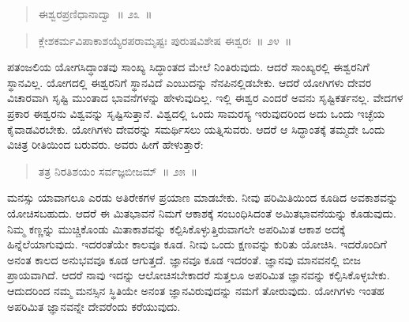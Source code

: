 \begin{verse}
ಈಶ್ವರಪ್ರಣಿಧಾನಾದ್ವಾ~॥ ೨೩~॥
\end{verse}

\vspace{-0.35cm}


\vspace{-0.1cm}

\begin{verse}
ಕ್ಲೇಶಕರ್ಮವಿಪಾಕಾಶಯ್ಯೆರಪರಾಮೃಷ್ಟಃ ಪುರುಷವಿಶೇಷ ಈಶ್ವರಃ~॥ ೨೪~॥
\end{verse}

\vspace{-0.4cm}


\vspace{0.1cm}

ಪತಂಜಲಿಯ ಯೋಗಸಿದ್ಧಾಂತವು ಸಾಂಖ್ಯ ಸಿದ್ಧಾಂತದ ಮೇಲೆ ನಿಂತಿರುವುದು. ಆದರೆ ಸಾಂಖ್ಯರಲ್ಲಿ ಈಶ್ವರನಿಗೆ ಸ್ಥಾನವಿಲ್ಲ. ಯೋಗದಲ್ಲಿ ಈಶ್ವರನಿಗೆ ಸ್ಥಾನವಿದೆ ಎಂಬುದನ್ನು ನೆನಪಿನಲ್ಲಿಡಬೇಕು. ಆದರೆ ಯೋಗಿಗಳು ದೇವರ ವಿಚಾರವಾಗಿ ಸೃಷ್ಟಿ ಮುಂತಾದ ಭಾವನೆ\break ಗಳನ್ನು ಹೇಳುವುದಿಲ್ಲ. ಇಲ್ಲಿ ಈಶ್ವರ ಎಂದರೆ ಅವನು ಸೃಷ್ಟಿಕರ್ತನಲ್ಲ. ವೇದಗಳ ಪ್ರಕಾರ ಈಶ್ವರನು ವಿಶ್ವವನ್ನು ಸೃಷ್ಟಿಸುತ್ತಾನೆ. ವಿಶ್ವದಲ್ಲಿ ಒಂದು ಸಾಮರಸ್ಯ ಇರುವುದರಿಂದ ಅದು ಒಂದು ಇಚ್ಛೆಯ ಕೈವಾಡವಿರಬೇಕು. ಯೋಗಿಗಳು ದೇವರನ್ನು ಸಮರ್ಥಿಸಲು ಯತ್ನಿಸುವರು. ಆದರೆ ಆ ಸಿದ್ಧಾಂತಕ್ಕೆ ತಮ್ಮದೇ ಒಂದು ವಿಚಿತ್ರ ರೀತಿಯಿಂದ ಬರುವರು. ಅವರು ಹೀಗೆ ಹೇಳುತ್ತಾರೆ:

\vspace{-0.25cm}

\begin{verse}
ತತ್ರ ನಿರತಿಶಯಂ ಸರ್ವಜ್ಞಬೀಜಮ್​~॥ ೨೫~॥
\end{verse}

\vspace{-0.4cm}


ಮನಸ್ಸು ಯಾವಾಗಲೂ ಎರಡು ಅತಿರೇಕಗಳ ಪ್ರಯಾಣ ಮಾಡಬೇಕು. ನೀವು ಪರಿಮಿತಿಯಿಂದ ಕೂಡಿದ ಅವಕಾಶವನ್ನು ಯೋಚಿಸಬಹುದು. ಆದರೆ ಈ ಮಿತಭಾವನೆ ನಿಮಗೆ ಆಕಾಶಕ್ಕೆ ಸಂಬಂಧಿಸಿದಂತೆ ಅಮಿತಭಾವನೆಯನ್ನು ಕೊಡುವುದು. ನಿಮ್ಮ ಕಣ್ಣನ್ನು ಮುಚ್ಚಿಕೊಂಡು ಮಿತಾಕಾಶವನ್ನು ಕಲ್ಪಿಸಿಕೊಳ್ಳುತ್ತಿರುವಾಗಲೇ ಅಪರಿಮಿತ ಆಕಾಶ ಅದಕ್ಕೆ ಹಿನ್ನೆಲೆಯಾಗುವುದು. ಇದರಂತೆಯೇ ಕಾಲವೂ ಕೂಡ. ನೀವು ಒಂದು ಕ್ಷಣವನ್ನು ಕುರಿತು ಯೋಚಿಸಿ. ಇದರೊಂದಿಗೆ ಅನಂತ ಕಾಲದ ಅನುಭವವೂ ಕೂಡ ಆಗುತ್ತದೆ. ಜ್ಞಾನವೂ ಕೂಡ ಇದರಂತೆ. ಜ್ಞಾನವು ಮಾನವನಲ್ಲಿ ಬೀಜ ಪ್ರಾಯವಾಗಿದೆ. ಆದರೆ ನಾವು ಇದನ್ನು ಆಲೋಚಿಸಬೇಕಾದರೆ ಸುತ್ತಲೂ ಅಪರಿಮಿತ ಜ್ಞಾನವನ್ನು ಕಲ್ಪಿಸಿಕೊಳ್ಳಬೇಕು. ಆದುದರಿಂದ ನಮ್ಮ ಮನಸ್ಸಿನ ಸ್ಥಿತಿಯೇ ಅನಂತ ಜ್ಞಾನವಿರುವುದನ್ನು ನಮಗೆ ತೋರುವುದು. ಯೋಗಿಗಳು ಇಂತಹ ಅಪರಿಮಿತ ಜ್ಞಾನವನ್ನೇ ದೇವರೆಂದು ಕರೆಯುವುದು.

